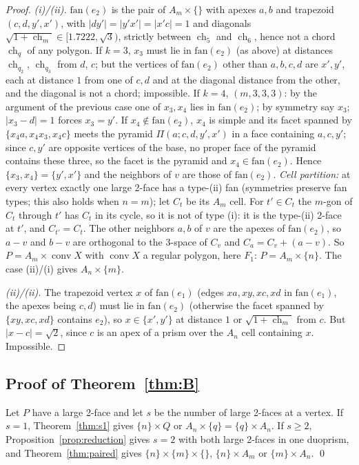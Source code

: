 \documentclass[11pt]{article}
\theoremstyle{definition}
\theoremstyle{remark}
\newcommand{\conv}{\operatorname{conv}}
\newcommand{\ch}{\operatorname{ch}}
\begin{document}
\begin{proof}
\emph{(i)/(ii).} $\mathrm{fan}(e_2)$ is the pair of $A_m\times\{\}$ with
apexes $a,b$ and trapezoid $(c,d,y',x')$, with $|dy'|=|y'x'|=|x'c|=1$ and
diagonals $\sqrt{1+\ch_m}\in[1.7222,\sqrt3)$, strictly between $\ch_5$ and
$\ch_6$, hence not a chord $\ch_q$ of any polygon. If $k=3$, $x_3$ must lie in
$\mathrm{fan}(e_2)$ (as above) at distances $\ch_{q_2}$, $\ch_{q_3}$ from $d$,
$c$; but the vertices of $\mathrm{fan}(e_2)$ other than $a,b,c,d$ are $x',y'$,
each at distance $1$ from one of $c,d$ and at the diagonal distance from the
other, and the diagonal is not a chord; impossible. If
$k=4$, $(m,3,3,3)$: by the argument of the previous case one of $x_3,x_4$
lies in $\mathrm{fan}(e_2)$; by symmetry say $x_3$; $|x_3-d|=1$ forces
$x_3=y'$. If $x_4\notin\mathrm{fan}(e_2)$, $x_4$ is simple and its facet
spanned by $\{x_4a,x_4x_3,x_4c\}$ meets the pyramid $\Pi(a;c,d,y',x')$ in a
face containing $a,c,y'$; since $c,y'$ are opposite vertices of the base, no
proper face of the pyramid contains these three, so the facet is the
pyramid and $x_4\in\mathrm{fan}(e_2)$. Hence $\{x_3,x_4\}=\{y',x'\}$ and the
neighbors of $v$ are those of $\mathrm{fan}(e_2)$. \emph{Cell partition:}
at every vertex exactly one large 2-face has a type-(ii) fan (symmetries
preserve fan types; this also holds when $n=m$); let $C_t$ be its $A_m$
cell. For $t'\in C_t$ the $m$-gon of $C_t$ through $t'$ has $C_t$ in its
cycle, so it is not of type (i): it is the type-(ii) 2-face at $t'$, and
$C_{t'}=C_t$. The other neighbors $a,b$ of $v$ are the apexes of
$\mathrm{fan}(e_2)$, so $a-v$ and $b-v$ are orthogonal to the 3-space of
$C_v$ and $C_a=C_v+(a-v)$. So $P=A_m\times\conv X$ with $\conv X$ a regular
polygon, here $F_1$: $P=A_m\times\{n\}$. The case (ii)/(i) gives
$A_n\times\{m\}$.

\emph{(ii)/(ii).} The trapezoid vertex $x$ of $\mathrm{fan}(e_1)$ (edges
$xa,xy,xc,xd$ in $\mathrm{fan}(e_1)$, the apexes being $c,d$) must lie in
$\mathrm{fan}(e_2)$ (otherwise the facet spanned by $\{xy,xc,xd\}$ contains
$e_2$), so $x\in\{x',y'\}$ at distance $1$ or $\sqrt{1+\ch_m}$ from $c$. But
$|x-c|=\sqrt2$, since $c$ is an apex of a prism over the $A_n$ cell
containing $x$. Impossible.
\end{proof}


\subsection{Proof of Theorem~\ref{thm:B}}

Let $P$ have a large 2-face and let $s$ be the number of large 2-faces at a
vertex. If $s=1$, Theorem~\ref{thm:s1} gives $\{n\}\times Q$ or
$A_n\times\{q\}=\{q\}\times A_n$. If $s\ge2$, Proposition~\ref{prop:reduction}
gives $s=2$ with both large 2-faces in one duoprism, and
Theorem~\ref{thm:paired} gives $\{n\}\times\{m\}\times\{\}$, $\{n\}\times A_m$
or $\{m\}\times A_n$. \qed
\end{document}
